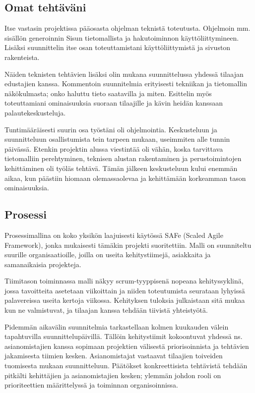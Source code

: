 \documentclass{article}
\begin{document}
\subsection{Omat tehtäväni}

Itse vastasin projektissa pääosasta ohjelman teknistä toteutusta. Ohjelmoin mm.
sisällön generoinnin Sisun tietomallista ja hakutoiminnon käyttöliittymineen.
Lisäksi suunnittelin itse osan toteuttamistani käyttöliittymistä ja sivuston
rakenteista.

Näiden teknisten tehtävien lisäksi olin mukana suunnittelussa yhdessä tilaajan
edustajien kanssa. Kommentoin suunnitelmia erityisesti tekniikan ja tietomallin
näkökulmasta; onko haluttu tieto saa\-ta\-vil\-la ja mi\-ten. Esittelin myös
toteuttamiani ominaisuuksia suoraan tilaajille ja kävin heidän kans\-saan
palaute\-kes\-kus\-teluja.

Tuntimääräisesti suurin osa työstäni oli ohjelmointia. Keskusteluun ja
suunnitteluun osallistumista tein tarpeen mukaan, useimmiten alle tunnin
päivässä. Etenkin projektin alussa viestintää oli vähän, koska tarvittava
tietomalliin perehtyminen, teknisen alustan rakentaminen ja perustoimintojen
kehittäminen oli työläs tehtävä. Tämän jälkeen keskusteluun kului enemmän
aikaa, kun päästiin hio\-maan olemassaolevaa ja kehittämään korkeamman tason
ominaisuuksia.

\subsection{Prosessi}

Prosessimallina on koko yksikön laajuisesti käytössä SAFe (Scaled Agile
Framework), jonka mu\-kai\-ses\-ti tämäkin projekti suoritettiin. Malli on
suunniteltu suurille organisaatioille, joilla on useita kehitystiimejä,
asiakkaita ja samanaikaisia projekteja.

Tiimitason toiminnassa malli näkyy scrum-tyyppisenä nopeana kehityssyklinä,
jossa tavoitteita ase\-tetaan viikoittain ja niiden toteutumista seurataan
lyhyissä palavereissa useita kertoja viikossa. Kehityksen tuloksia julkaistaan
sitä mukaa kun ne valmistuvat, ja tilaajan kanssa tehdään tiivistä
yhteis\-työtä.

Pidemmän aikavälin suunnitelmia tarkastellaan kolmen kuukauden välein
tapahtuvilla suunnittelu\-päivillä. Tällöin kehitystiimit kokoontuvat yhdessä
ns. asianomistajien kanssa sopimaan projektien välisestä priorisoinnista ja
tehtävien jakamisesta tiimien kesken. Asianomistajat vastaavat tilaajien
toiveiden tuomisesta mukaan suunnitteluun. Päätökset konkreettisista
tehtävis\-tä tehdään pitkälti kehittäjien ja asianomistajien kesken; ylemmän
johdon rooli on prioriteettien määrittelyssä ja toiminnan organisoinnissa.
\end{document}
